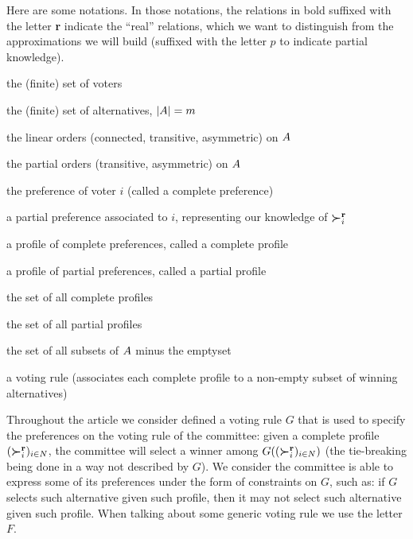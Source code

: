 \documentclass[version=last, pagesize, twoside=off, bibliography=totoc, DIV=calc, fontsize=14pt, a4paper, french, english]{scrartcl}
\begin{document}
Here are some notations. In those notations, the relations in bold suffixed with the letter \textbf{r} indicate the “real” relations, which we want to distinguish from the approximations we will build (suffixed with the letter $p$ to indicate partial knowledge).
\begin{description}[font=\normalfont, leftmargin=!, labelwidth=\widthof{$F: \allprofs \rightarrow \powersetz{\alts}$}]
	\item[$N$] the (finite) set of voters
	\item[$\alts$] the (finite) set of alternatives, $\lvert{A}\rvert = m$
	\item[$\linors \subseteq \powerset{\alts × \alts}$] the linear orders (connected, transitive, asymmetric) on $\alts$
	\item[$\pors \subseteq \powerset{\alts × \alts}$] the partial orders (transitive, asymmetric) on $\alts$
	\item[$\pref_i \in \linors$] the preference of voter $i$ (called a complete preference)
	\item[$\ppref_i \in \pors$] a partial preference associated to $i$, representing our knowledge of $\boldsymbol{\succ}^\textbf{r}_i$
	\item[$\prof = \profshort$] a profile of complete preferences, called a complete profile
	\item[$\pprof = \pprofshort$] a profile of partial preferences, called a partial profile
	\item[$\allprofs$] the set of all complete profiles
	\item[$\allpprofs$] the set of all partial profiles
	\item[$\powersetz{\alts}$] the set of all subsets of $\alts$ minus the emptyset
	\item[$F: \allprofs \rightarrow \powersetz{\alts}$] a voting rule (associates each complete profile to a non-empty subset of winning alternatives)
\end{description}

Throughout the article we consider defined a voting rule $G$ that is used to specify the preferences on the voting rule of the committee: given a complete profile $(\boldsymbol{\succ}^\textbf{r}_i)_{i \in N}$, the committee will select a winner among $G((\boldsymbol{\succ}^\textbf{r}_i)_{i \in N})$ (the tie-breaking being done in a way not described by $G$). We consider the committee is able to express some of its preferences under the form of constraints on $G$, such as: if $G$ selects such alternative given such profile, then it may not select such alternative given such profile.
When talking about some generic voting rule we use the letter $F$. 
\end{document}

